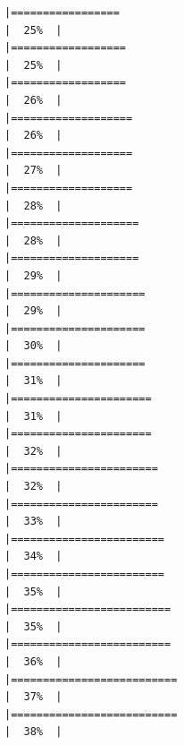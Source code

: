 \documentclass[
  english,
  man,a4paper,mask,floatsintext]{apa6}
\begin{document}
\begin{verbatim}
|=================                                                     |  25%  |                                                                              |==================                                                    |  25%  |                                                                              |==================                                                    |  26%  |                                                                              |===================                                                   |  26%  |                                                                              |===================                                                   |  27%  |                                                                              |===================                                                   |  28%  |                                                                              |====================                                                  |  28%  |                                                                              |====================                                                  |  29%  |                                                                              |=====================                                                 |  29%  |                                                                              |=====================                                                 |  30%  |                                                                              |=====================                                                 |  31%  |                                                                              |======================                                                |  31%  |                                                                              |======================                                                |  32%  |                                                                              |=======================                                               |  32%  |                                                                              |=======================                                               |  33%  |                                                                              |========================                                              |  34%  |                                                                              |========================                                              |  35%  |                                                                              |=========================                                             |  35%  |                                                                              |=========================                                             |  36%  |                                                                              |==========================                                            |  37%  |                                                                              |==========================                                            |  38%  |                                                                              
\end{verbatim}
\end{document}
